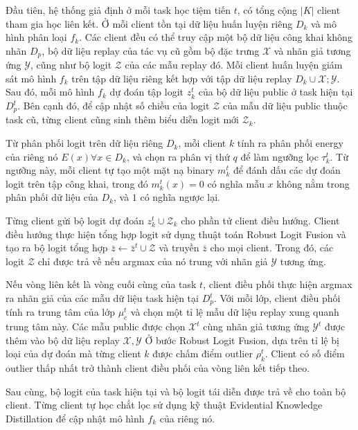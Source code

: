 Đầu tiên, hệ thống giả định ở mỗi task học tiệm tiến $t$, có tổng cộng $|K|$ client tham gia học liên kết. Ở mỗi client tồn tại dữ liệu huấn luyện riêng $D_k$ và mô hình phân loại $f_k$. Các client đều có thể truy cập một bộ dữ liệu công khai không nhãn $D_p$, bộ dữ liệu replay của tác vụ cũ gồm bộ đặc trưng $\mathcal X$ và nhãn giả tương ứng $\mathcal Y$, cũng như bộ logit $\mathcal Z$ của các mẫu replay đó. Mỗi client huấn luyện giám sát mô hình $f_k$ trên tập dữ liệu riêng kết hợp với tập dữ liệu replay $D_k \cup {\mathcal X; \mathcal Y}$. Sau đó, mỗi mô hình $f_k$ dự đoán tập logit $z_k^t$ của bộ dữ liệu public ở task hiện tại $D_p^t$. Bên cạnh đó, để cập nhật số chiều của logit $\mathcal Z$ của mẫu dữ liệu public thuộc task cũ, từng client cũng sinh thêm biểu diễn logit mới $\mathcal Z_k$.

Từ phân phối logit trên dữ liệu riêng $D_k$, mỗi client $k$ tính ra phân phối energy của riêng nó $E(x) \forall x \in D_k$, và chọn ra phân vị thứ $q$ để làm ngưỡng lọc $\tau_k^t$. Từ ngưỡng này, mỗi client tự tạo một mặt nạ binary $m_k^t$ để đánh dấu các dự đoán logit trên tập công khai, trong đó $m_k^t(x) = 0$ có nghĩa mẫu $x$ không nằm trong phân phối dữ liệu của $D_k$, và $1$ có nghĩa ngược lại.

Từng client gửi bộ logit dự đoán $z_k^t \cup \mathcal Z_k$ cho phần tử client điều hướng. Client điều hướng thực hiện tổng hợp logit sử dụng thuật toán Robust Logit Fusion và tạo ra bộ logit tổng hợp $\bar z \leftarrow \bar z^t \cup \mathcal Z$ và truyền $\bar z$ cho mọi client. Trong đó, các logit $\mathcal Z$ chỉ được trả về nếu argmax của nó trung với nhãn giả $\mathcal Y$ tương ứng.

Nếu vòng liên kết là vòng cuối cùng của task $t$, client điều phối thực hiện argmax ra nhãn giả của các mẫu dữ liệu task hiện tại $D_p^t$. Với mỗi lớp, client điều phối tính ra trung tâm của lớp $\mu_c^t$ và chọn một tỉ lệ mẫu dữ liệu replay xung quanh trung tâm này. Các mẫu public được chọn $\mathcal X^t$ cùng nhãn giả tương ứng $\mathcal Y^t$ được thêm vào bộ dữ liệu replay $\mathcal X, \mathcal Y$ Ở bước Robust Logit Fusion, dựa trên tỉ lệ bị loại của dự đoán mà từng client $k$ được chấm điểm outlier $\rho_k^t$. Client có số điểm outlier thấp nhất trở thành client điều phối của vòng liên kết tiếp theo.

Sau cùng, bộ logit của task hiện tại và bộ logit tái diễn được trả về cho toàn bộ client. Từng client tự học chắt lọc sử dụng kỹ thuật Evidential Knowledge Distillation để cập nhật mô hình $f_k$ của riêng nó.

